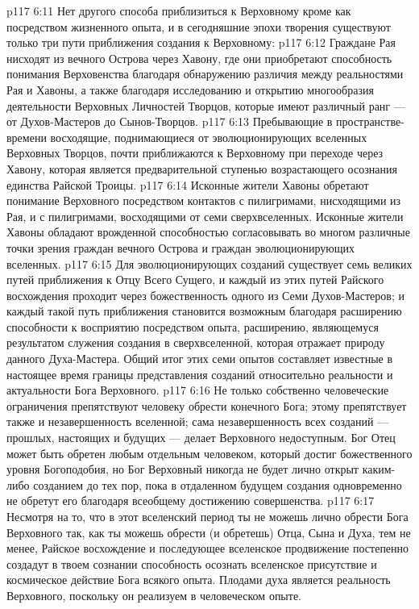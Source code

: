 \vs p117 6:11 \pc Нет другого способа приблизиться к Верховному кроме как посредством жизненного опыта, и в сегодняшние эпохи творения существуют только три пути приближения создания к Верховному:
\vs p117 6:12 \bibnobreakspace Граждане Рая нисходят из вечного Острова через Хавону, где они приобретают способность понимания Верховенства благодаря обнаружению различия между реальностями Рая и Хавоны, а также благодаря исследованию и открытию многообразия деятельности Верховных Личностей Творцов, которые имеют различный ранг --- от Духов\hyp{}Мастеров до Сынов\hyp{}Творцов.
\vs p117 6:13 \pc {}\bibnobreakspace Пребывающие в пространстве\hyp{}времени восходящие, поднимающиеся от эволюционирующих вселенных Верховных Творцов, почти приближаются к Верховному при переходе через Хавону, которая является предварительной ступенью возрастающего осознания единства Райской Троицы.
\vs p117 6:14 \pc {}\bibnobreakspace Исконные жители Хавоны обретают понимание Верховного посредством контактов с пилигримами, нисходящими из Рая, и с пилигримами, восходящими от семи сверхвселенных. Исконные жители Хавоны обладают врожденной способностью согласовывать во многом различные точки зрения граждан вечного Острова и граждан эволюционирующих вселенных.
\vs p117 6:15 \pc Для эволюционирующих созданий существует семь великих путей приближения к Отцу Всего Сущего, и каждый из этих путей Райского восхождения проходит через божественность одного из Семи Духов\hyp{}Мастеров; и каждый такой путь приближения становится возможным благодаря расширению способности к восприятию посредством опыта, расширению, являющемуся результатом служения создания в сверхвселенной, которая отражает природу данного Духа\hyp{}Мастера. Общий итог этих семи опытов составляет известные в настоящее время границы представления созданий относительно реальности и актуальности Бога Верховного.
\vs p117 6:16 Не только собственно человеческие ограничения препятствуют человеку обрести конечного Бога; этому препятствует также и незавершенность вселенной; сама незавершенность всех созданий --- прошлых, настоящих и будущих --- делает Верховного недоступным. Бог Отец может быть обретен любым отдельным человеком, который достиг божественного уровня Богоподобия, но Бог Верховный никогда не будет лично открыт каким\hyp{}либо  созданием до тех пор, пока в отдаленном будущем  создания одновременно не обретут его благодаря всеобщему достижению совершенства.
\vs p117 6:17 Несмотря на то, что в этот вселенский период ты не можешь лично обрести Бога Верховного так, как ты можешь обрести (и обретешь) Отца, Сына и Духа, тем не менее, Райское восхождение и последующее вселенское продвижение постепенно создадут в твоем сознании способность осознать вселенское присутствие и космическое действие Бога всякого опыта. Плодами духа является реальность Верховного, поскольку он реализуем в человеческом опыте.
